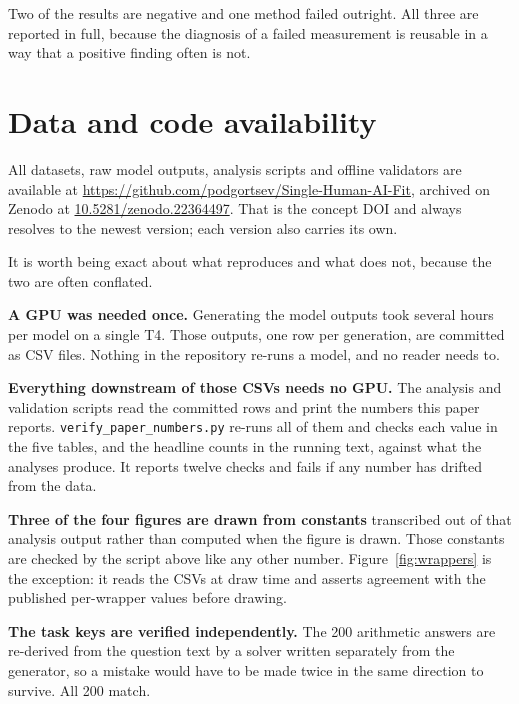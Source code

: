 \documentclass[11pt]{article}
\begin{document}
Two of the results are negative and one method failed outright. All three are
reported in full, because the diagnosis of a failed measurement is reusable in
a way that a positive finding often is not.

\section*{Data and code availability}

All datasets, raw model outputs, analysis scripts and offline validators are
available at \url{https://github.com/podgortsev/Single-Human-AI-Fit}, archived
on Zenodo at \href{https://doi.org/10.5281/zenodo.22364497}{10.5281/zenodo.22364497}. That is the concept DOI and
always resolves to the newest version; each version also carries its own.

It is worth being exact about what reproduces and what does not, because the
two are often conflated.

\textbf{A GPU was needed once.} Generating the model outputs took several
hours per model on a single T4. Those outputs, one row per generation, are
committed as CSV files. Nothing in the repository re-runs a model, and no
reader needs to.

\begin{sloppypar}
\textbf{Everything downstream of those CSVs needs no GPU.} The analysis and
validation scripts read the committed rows and print the numbers this paper
reports. \texttt{verify\_paper\_numbers.py} re-runs all of them and checks
each value in the five tables, and the headline counts in the running text,
against what the analyses produce. It reports twelve checks and fails if any
number has drifted from the data.
\end{sloppypar}

\textbf{Three of the four figures are drawn from constants} transcribed out of
that analysis output rather than computed when the figure is drawn. Those
constants are checked by the script above like any other number.
Figure~\ref{fig:wrappers} is the exception: it reads the CSVs at draw time and
asserts agreement with the published per-wrapper values before drawing.

\textbf{The task keys are verified independently.} The 200 arithmetic answers
are re-derived from the question text by a solver written separately from the
generator, so a mistake would have to be made twice in the same direction to
survive. All 200 match.
\end{document}
